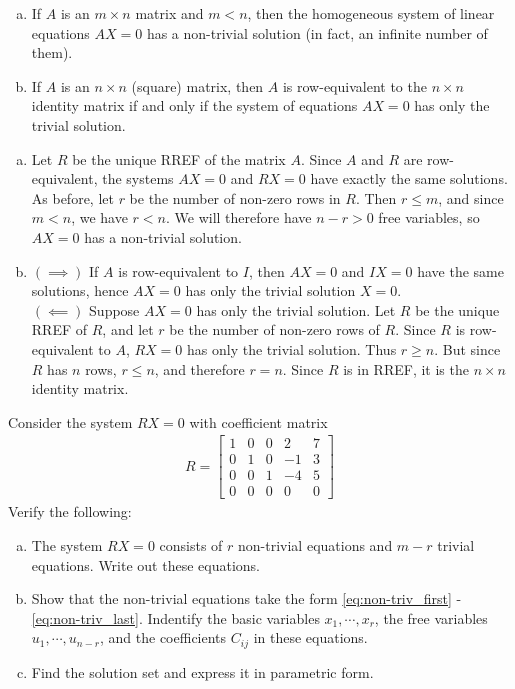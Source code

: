 \documentclass[12pt,letterpaper,reqno]{article}
\numberwithin{equation}{section}
\begin{document}
\begin{thm}\label{thm:solution_sets_of_homogeneous_linear_systems} \hspace{10cm}
	\begin{enumerate}[(a)]
		\item If $A$ is an $m \times n$ matrix and $m<n$, then the homogeneous system of linear equations $AX=0$ has a non-trivial solution (in fact, an infinite number of them). 
		\item If $A$ is an $n \times n$ (square) matrix, then $A$ is row-equivalent to the $n \times n$ identity matrix if and only if the system of equations $AX=0$ has only the trivial solution.
	\end{enumerate}
\end{thm}

\begin{pf}
	\begin{enumerate}[(a)]
		\item Let $R$ be the unique RREF of the matrix $A$. Since $A$ and $R$ are row-equivalent, the systems $AX=0$ and $RX=0$ have exactly the same solutions. As before, let $r$ be the number of non-zero rows in $R$. Then $r \leq m$, and since $m < n$, we have $r<n$. We will therefore have $n-r>0$ free variables, so $AX=0$ has a non-trivial solution. 
		\item $(\implies)$ If $A$ is row-equivalent to $I$, then $AX=0$ and $IX=0$ have the same solutions, hence $AX=0$ has only the trivial solution $X=0$. \\
		$(\impliedby)$ Suppose $AX=0$ has only the trivial solution. Let $R$ be the unique RREF of $R$, and let $r$ be the number of non-zero rows of $R$. Since $R$ is row-equivalent to $A$, $RX=0$ has only the trivial solution. Thus $r \geq n$. But since $R$ has $n$ rows, $r \leq n$, and therefore $r=n$. Since $R$ is in RREF, it is the $n \times n$ identity matrix.
	\end{enumerate}
\end{pf}
\begin{exercise}
Consider the system $RX=0$ with coefficient matrix
\begin{align*}
	R=\begin{bmatrix}
		1&0&0&2&7 \\
		0&1&0&-1&3 \\
		0&0&1&-4&5 \\
		0&0&0&0&0 
	\end{bmatrix}
\end{align*}
Verify the following:
\begin{enumerate}[(a)]
	\item The system $RX=0$ consists of $r$ non-trivial equations and $m-r$ trivial equations. Write out these equations.
	\item Show that the non-trivial equations take the form \eqref{eq:non-triv_first} - \eqref{eq:non-triv_last}. Indentify the basic variables $x_1,\cdots,x_r$, the free variables $u_1,\cdots,u_{n-r}$, and the coefficients $C_{ij}$ in these equations.
	\item Find the solution set and express it in parametric form.
\end{enumerate}	
\end{exercise}
\end{document}
